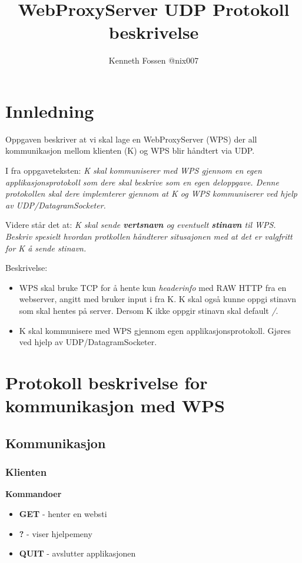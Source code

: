 \documentclass[norsk,a4paper]{article}
\title{WebProxyServer UDP Protokoll beskrivelse}
\author{Kenneth Fossen @nix007}
\begin{document}
\maketitle
\tableofcontents{}
\listoffigures

\clearpage

\section{Innledning}

Oppgaven beskriver at vi skal lage en WebProxyServer (WPS) der all kommunikasjon mellom klienten (K) og WPS blir håndtert via UDP.

I fra oppgaveteksten:
\textit{K skal kommuniserer med WPS gjennom en egen applikasjonsprotokoll som dere skal beskrive som en egen deloppgave. Denne protokollen skal dere implemterer gjennom at K og WPS kommuniserer ved hjelp av UDP/DatagramSocketer.}

Videre står det at: \textit{K skal sende \textbf{vertsnavn} og eventuelt \textbf{stinavn} til WPS. Beskriv spesielt hvordan protkollen håndterer situsajonen med at det er valgfritt for K å sende stinavn.}

Beskrivelse:
\begin{itemize}
  \item WPS skal bruke TCP for å hente kun \textit{headerinfo} med RAW HTTP fra en webserver, angitt med bruker input i fra K.
  K skal også kunne oppgi stinavn som skal hentes på server.
  Dersom K ikke oppgir stinavn skal default \textit{/}.
  \item K skal kommunisere med WPS gjennom egen applikasjonsprotokoll.
  Gjøres ved hjelp av UDP/DatagramSocketer.
\end{itemize}

\clearpage

\section{Protokoll beskrivelse for kommunikasjon med WPS}
\subsection{Kommunikasjon}

\subsubsection{Klienten}
\textbf{Kommandoer}
\begin{itemize}
  \item \textbf{GET} - henter en websti
  \item \textbf{?} - viser hjelpemeny
  \item \textbf{QUIT} - avslutter applikasjonen
\end{itemize}
\end{document}
